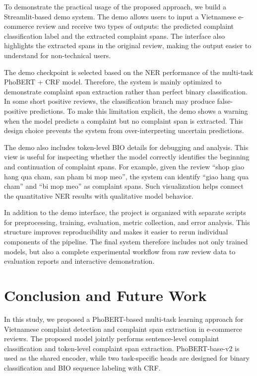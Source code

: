 \documentclass[11pt]{article}
\begin{document}
To demonstrate the practical usage of the proposed approach, we build a Streamlit-based demo system. The demo allows users to input a Vietnamese e-commerce review and receive two types of outputs: the predicted complaint classification label and the extracted complaint spans. The interface also highlights the extracted spans in the original review, making the output easier to understand for non-technical users.

The demo checkpoint is selected based on the NER performance of the multi-task PhoBERT + CRF model. Therefore, the system is mainly optimized to demonstrate complaint span extraction rather than perfect binary classification. In some short positive reviews, the classification branch may produce false-positive predictions. To make this limitation explicit, the demo shows a warning when the model predicts a complaint but no complaint span is extracted. This design choice prevents the system from over-interpreting uncertain predictions.

The demo also includes token-level BIO details for debugging and analysis. This view is useful for inspecting whether the model correctly identifies the beginning and continuation of complaint spans. For example, given the review ``shop giao hang qua cham, san pham bi mop meo'', the system can identify ``giao hang qua cham'' and ``bi mop meo'' as complaint spans. Such visualization helps connect the quantitative NER results with qualitative model behavior.

In addition to the demo interface, the project is organized with separate scripts for preprocessing, training, evaluation, metric collection, and error analysis. This structure improves reproducibility and makes it easier to rerun individual components of the pipeline. The final system therefore includes not only trained models, but also a complete experimental workflow from raw review data to evaluation reports and interactive demonstration.

\section{Conclusion and Future Work}

In this study, we proposed a PhoBERT-based multi-task learning approach for Vietnamese complaint detection and complaint span extraction in e-commerce reviews. The proposed model jointly performs sentence-level complaint classification and token-level complaint span extraction. PhoBERT-base-v2 is used as the shared encoder, while two task-specific heads are designed for binary classification and BIO sequence labeling with CRF.
\end{document}
